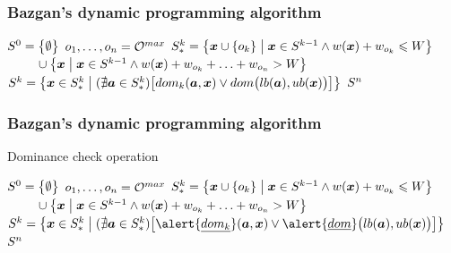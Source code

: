%
\begin{frame}
\frametitle{Bazgan's dynamic programming algorithm}
\begin{center}
\end{center}

\begin{algorithmic}[1]
    \State $S^0 = \big\{\emptyset\big\}$ \pause
    \State $o_1, \ldots, o_n = \mathcal{O}^{max}$ \pause
     \pause
      \State $S_*^k = \big\{\boldsymbol{x} \cup \{o_k\} \;\big|\; \boldsymbol{x}
        \in S^{k-1} \land w(\boldsymbol{x}) + w_{o_k} \leqslant W \big\}$ \pause
      \State $\phantom{\solSett^k = } \cup \big\{ \sol{x} \;\big|\; \sol{x} \in \solSet^{k-1} \logicAnd
        \weight{x} + w_{o_k} + \ldots + w_{o_n} > W \big\}$ \pause
      \State $S^k = \left\{\boldsymbol{x} \in S_*^k \;\middle|\;
        (\nexists \boldsymbol{a} \in S_*^k)\big[dom_k(\boldsymbol{a}, \boldsymbol{x})
          \lor dom\big(lb(\boldsymbol{a}), ub(\boldsymbol{x})\big)\big] \right\}$ \pause
    \EndFor
    \State \Return $S^n$
  \EndFunction
\end{algorithmic}
\end{frame}
\begin{frame}
\frametitle{Bazgan's dynamic programming algorithm}
\begin{center}
\alert{Dominance check operation}
\end{center}
\begin{algorithmic}[1]
    \State $S^0 = \big\{\emptyset\big\}$
    \State $o_1, \ldots, o_n = \mathcal{O}^{max}$
      \State $S_*^k = \big\{\boldsymbol{x} \cup \{o_k\} \;\big|\; \boldsymbol{x}
        \in S^{k-1} \land w(\boldsymbol{x}) + w_{o_k} \leqslant W \big\}$
      \State $\phantom{\solSett^k = } \cup \big\{ \sol{x} \;\big|\; \sol{x} \in \solSet^{k-1} \logicAnd
        \weight{x} + w_{o_k} + \ldots + w_{o_n} > W \big\}$
      \State $\solSet^k = \left\{\sol{x} \in \solSett^k \;\middle|\;
        (\nexists \sol{a} \in \solSett^k)\big[\alert{\underline{dom_k}}(\sol{a}, \sol{x})
          \logicOr \alert{\underline{dom}}\big(lb(\sol{a}), ub(\sol{x})\big)\big] \right\}$
    \EndFor
    \State \Return $S^n$
  \EndFunction
\end{algorithmic}
\end{frame}

